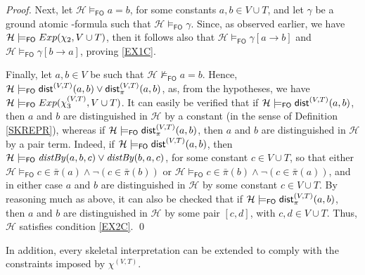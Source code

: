 \documentclass[a4paper]{llncs}
\newcommand{\HExp}{Exp}
\newcommand{\pair}[2]{[#1,#2]}
\newcommand{\nonpairin}[2]{#1 \in \bar{\pi}(#2)}
\newcommand{\seteq}[2]{#1=#2}
\newcommand{\consta}{a}
\newcommand{\constb}{b}
\newcommand{\constc}{c}
\newcommand{\subst}[3]{#1[#2\rightarrow#3]}
\newcommand{\hinter}{\ensuremath{\mathcal{H}}}
\newcommand{\fomodels}[2]{#1 \models_{\mathsf{FO}} #2}
\newcommand{\notfomodels}[2]{#1 \not\models_{\mathsf{FO}} #2}
\begin{document}
\begin{proof}
Next, let $\fomodels{\hinter}{\seteq{\consta}{\constb}}$, for some constants
$\consta, \constb \in V \cup T$, and let $\gamma$ be a ground atomic 
\Forallpizero-formula such that $\fomodels{\hinter}{\gamma}$.
Since, as observed earlier, we have 
$\fomodels{\hinter}{\HExp(\exonef, V \cup T)}$, then it follows also 
that
$\fomodels{\hinter}{\subst{\gamma}{\consta}{\constb}}$ and 
$\fomodels{\hinter}{\subst{\gamma}{\constb}{\consta}}$, proving 
\ref{EX1C}.

Finally, let $\consta, \constb \in V$ be such that 
$\notfomodels{\hinter}{\seteq{\consta}{\constb}}$. Hence,
$\fomodels{\hinter}{\distS^{(V,T)}(\consta,\constb) \vee 
\distPS^{(V,T)}(\consta,\constb)}$, as, from the hypotheses, we have
$\fomodels{\hinter}{\HExp(\extwof, V \cup T)}$. It can easily be 
verified that if 
$\fomodels{\hinter}{\distS^{(V,T)}(\consta,\constb)}$,
then $\consta$ and $\constb$ are distinguished in $\hinter$ by a 
constant (in the sense of Definition \ref{SKREPR}), whereas if
$\fomodels{\hinter}{\distPS^{(V,T)}(\consta,\constb)}$, then 
$\consta$ and $\constb$ are distinguished in $\hinter$ by a pair term.
Indeed, if $\fomodels{\hinter}{\distS^{(V,T)}(\consta,\constb)}$, 
then $\fomodels{\hinter}{\distby{\consta}{\constb}{\constc} \vee
\distby{\constb}{\consta}{\constc}}$, for some constant $\constc \in 
V \cup T$, so that either 
$\fomodels{\hinter}{\nonpairin{\constc}{\consta} \wedge 
\neg(\nonpairin{\constc}{\constb})}$
or $\fomodels{\hinter}{\nonpairin{\constc}{\constb} 
\wedge\neg(\nonpairin{\constc}{\consta})}$, and in either case 
$\consta$ and
$\constb$ are distinguished in $\hinter$ by some constant $\constc 
\in V \cup T$. By reasoning much as
above, it can also be checked that if 
$\fomodels{\hinter}{\distPS^{(V,T)}(\consta,\constb)}$, then 
$\consta$ and $\constb$ are
distinguished in $\hinter$ by some pair $\pair{\constc}{d}$, with 
$\constc, d \in V \cup T$.
Thus, $\hinter$ satisfies condition \ref{EX2C}. \qed
\end{proof}
%
In addition, every skeletal interpretation can be extended to
comply with the constraints imposed by $\chi^{(V,T)}$.
\end{document}
